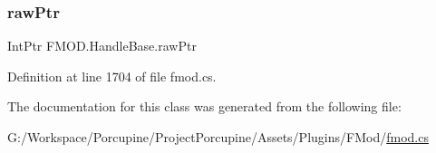 \subsubsection{\texorpdfstring{raw\+Ptr}{rawPtr}}
{\footnotesize\ttfamily Int\+Ptr F\+M\+O\+D.\+Handle\+Base.\+raw\+Ptr\hspace{0.3cm}{\ttfamily [protected]}}



Definition at line 1704 of file fmod.\+cs.



The documentation for this class was generated from the following file\+:\begin{DoxyCompactItemize}
\item 
G\+:/\+Workspace/\+Porcupine/\+Project\+Porcupine/\+Assets/\+Plugins/\+F\+Mod/\hyperlink{fmod_8cs}{fmod.\+cs}\end{DoxyCompactItemize}
